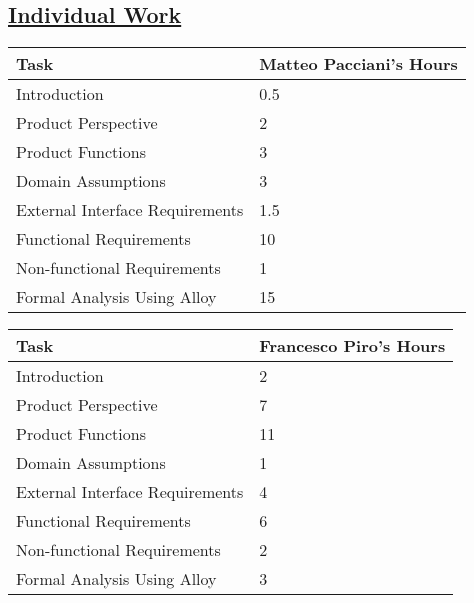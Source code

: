 \subsection[Individual Work]{\hyperlink{toc}{Individual Work}}
\vspace{2mm}
\begin{center}
	\begin{tabular}{| l | p{} |}
	\hline
	\textbf{Task} & \textbf{Matteo Pacciani's Hours} \\ \hline
	Introduction & 0.5 \\ \hline
	Product Perspective & 2 \\ \hline
	Product Functions & 3 \\ \hline
	Domain Assumptions & 3 \\ \hline
	External Interface Requirements & 1.5 \\ \hline
	Functional Requirements & 10 \\ \hline
	Non-functional Requirements & 1 \\ \hline
	Formal Analysis Using Alloy & 15 \\
	\hline	
	\end{tabular}
	
	\vspace{2mm}
	
	\begin{tabular}{| l | p{} |}
	\hline
	\textbf{Task} & \textbf{Francesco Piro's Hours} \\ \hline
	Introduction & 2 \\ \hline
	Product Perspective & 7 \\ \hline
	Product Functions & 11 \\ \hline
	Domain Assumptions & 1 \\ \hline
	External Interface Requirements & 4 \\ \hline
	Functional Requirements & 6 \\ \hline
	Non-functional Requirements & 2 \\ \hline
	Formal Analysis Using Alloy & 3 \\
	\hline	
	\end{tabular}
\end{center}